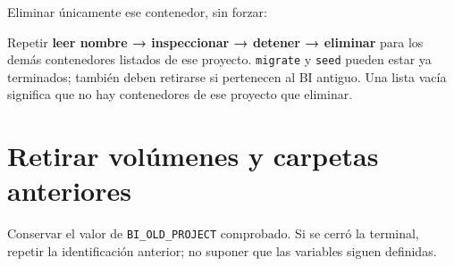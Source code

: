 \documentclass[
  spanish,
  10pt,
  a4paper,
]{article}
\newenvironment{Shaded}{}{}
\newcommand{\AttributeTok}[1]{#1}
\newcommand{\BuiltInTok}[1]{#1}
\newcommand{\ExtensionTok}[1]{#1}
\newcommand{\FunctionTok}[1]{#1}
\newcommand{\KeywordTok}[1]{\textbf{#1}}
\newcommand{\NormalTok}[1]{#1}
\newcommand{\OperatorTok}[1]{#1}
\newcommand{\OtherTok}[1]{#1}
\newcommand{\PreprocessorTok}[1]{\textbf{#1}}
\newcommand{\SpecialStringTok}[1]{#1}
\newcommand{\StringTok}[1]{#1}
\newcommand{\VariableTok}[1]{#1}
\renewenvironment{Shaded}{\begin{snugshade}}{\end{snugshade}}%
\begin{document}
Eliminar únicamente ese contenedor, sin forzar:

\begin{Shaded}
\end{Shaded}

Repetir \textbf{leer nombre → inspeccionar → detener → eliminar} para
los demás contenedores listados de ese proyecto. \texttt{migrate} y
\texttt{seed} pueden estar ya terminados; también deben retirarse si
pertenecen al BI antiguo. Una lista vacía significa que no hay
contenedores de ese proyecto que eliminar.

\clearpage

\section{Retirar volúmenes y carpetas
anteriores}\label{retirar-voluxfamenes-y-carpetas-anteriores}

Conservar el valor de \texttt{BI\_OLD\_PROJECT} comprobado. Si se cerró
la terminal, repetir la identificación anterior; no suponer que las
variables siguen definidas.
\end{document}
